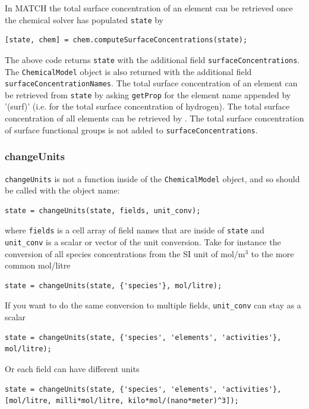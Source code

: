 \documentclass{article}
\begin{document}
In MATCH the total surface concentration of an element can be retrieved once the chemical solver has populated \verb|state| by

\begin{lstlisting}
[state, chem] = chem.computeSurfaceConcentrations(state);
\end{lstlisting}
The above code returns \verb|state| with the additional field \verb|surfaceConcentrations|. The \verb|ChemicalModel| object is also returned with the additional field \verb|surfaceConcentrationNames|. The total surface concentration of an element can be retrieved from \verb|state| by asking \verb|getProp| for the element name appended by '(surf)' (i.e.  for the total surface concentration of hydrogen). The total surface concentration of all elements can be retrieved by . The total surface concentration of surface functional groups is not added to \verb|surfaceConcentrations|.

\subsubsection{changeUnits}
\verb|changeUnits| is not a function inside of the \verb|ChemicalModel| object, and so should be called with the object name:

\begin{lstlisting}
state = changeUnits(state, fields, unit_conv);
\end{lstlisting}
where \verb|fields| is a cell array of field names that are inside of \verb|state| and \verb|unit_conv| is a scalar or vector of the unit conversion. Take for instance the conversion of all species concentrations from the SI unit of mol/m$^3$ to the more common mol/litre

\begin{lstlisting}
state = changeUnits(state, {'species'}, mol/litre);
\end{lstlisting}

If you want to do the same conversion to multiple fields, \verb|unit_conv| can stay as a scalar

\begin{lstlisting}
state = changeUnits(state, {'species', 'elements', 'activities'}, mol/litre);
\end{lstlisting}
Or each field can have different units

\begin{lstlisting}
state = changeUnits(state, {'species', 'elements', 'activities'}, [mol/litre, milli*mol/litre, kilo*mol/(nano*meter)^3]);
\end{lstlisting}
\end{document}
